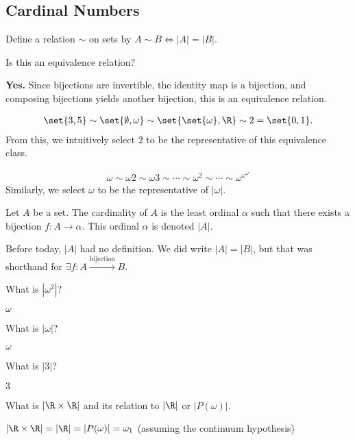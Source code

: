 \documentclass[10pt]{mypackage}
\begin{document}
\subsection{Cardinal Numbers}%
Define a relation $\sim$ on sets by $A\sim B \Leftrightarrow |A| = |B|$. 
\begin{question}
  Is this an equivalence relation?
\end{question}
\begin{answer}
  \textbf{Yes.} Since bijections are invertible, the identity map is a bijection, and composing bijections yields another bijection, this is an equivalence relation.
\end{answer}
\begin{example}
  \begin{align*}
    \set{3,5}\sim \set{\emptyset,\omega}\sim \set{\set{\omega},\R}\sim 2 = \set{0,1}.
  \end{align*}
  From this, we intuitively select $2$ to be the representative of this equivalence class.
\end{example}
\begin{example}
  \begin{align*}
    \omega \sim \omega 2 \sim \omega 3 \sim \cdots \sim \omega^2\sim \cdots \sim \omega^{\omega^{\omega}}
  \end{align*}
  Similarly, we select $\omega$ to be the representative of $\left\vert \omega \right\vert$.
\end{example}
\begin{definition}
  Let $A$ be a set. The cardinality of $A$ is the least ordinal $\alpha$ such that there exists a bijection $f: A\rightarrow \alpha$. This ordinal $\alpha$ is denoted $|A|$.
\end{definition}
\begin{remark}
  Before today, $|A|$ had no definition. We did write $|A| = |B|$, but that was shorthand for $\exists f: A\xrightarrow{\text{bijection}} B$.
\end{remark}
\begin{question}
  What is $\left|\omega^2\right|$?
  \begin{answer}
    $\omega$
  \end{answer}
  What is $\left\vert \omega \right\vert$?
  \begin{answer}
    $\omega$
  \end{answer}
  What is $|3|$?
  \begin{answer}
    $3$
  \end{answer}
  What is $|\R\times \R|$ and its relation to $|\R|$ or $|P(\omega)|$.
  \begin{answer}
    $\left\vert \R\times\R \right\vert = \left\vert \R \right\vert = \left\vert P(\omega) \right\vert = \omega_1$ (assuming the continuum hypothesis)
  \end{answer}
\end{question}
\end{document}
